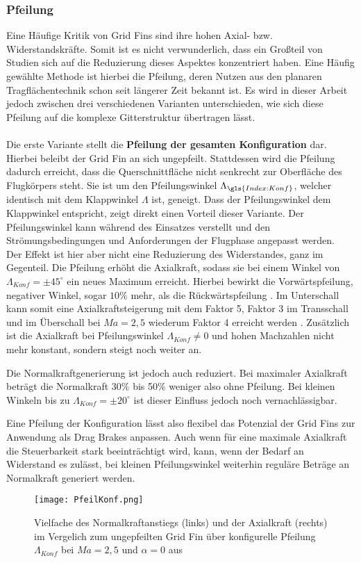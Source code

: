 \subsubsection{Pfeilung}
Eine Häufige Kritik von Grid Fins sind ihre hohen Axial- bzw. Widerstandskräfte. Somit ist es nicht verwunderlich, dass ein Großteil von Studien sich auf die Reduzierung dieses Aspektes konzentriert haben. Eine Häufig gewählte Methode ist hierbei die Pfeilung, deren Nutzen aus den planaren Tragflächentechnik schon seit längerer Zeit bekannt ist. Es wird in dieser Arbeit jedoch zwischen drei verschiedenen Varianten unterschieden, wie sich diese Pfeilung auf die komplexe Gitterstruktur übertragen lässt.\\
~\\
Die erste Variante stellt die \textbf{Pfeilung der gesamten Konfiguration} dar. Hierbei beleibt der Grid Fin an sich ungepfeilt. Stattdessen wird die Pfeilung dadurch erreicht, dass die Querschnittfläche nicht senkrecht zur Oberfläche des Flugkörpers steht. Sie ist um den Pfeilungswinkel $\Lambda_{\gls{Index:Konf}}$, welcher identisch mit dem Klappwinkel $\Lambda$ ist, geneigt. Dass der Pfeilungswinkel dem Klappwinkel entspricht, zeigt direkt einen Vorteil dieser Variante. Der Pfeilungswinkel kann während des Einsatzes verstellt und den Strömungsbedingungen und Anforderungen der Flugphase angepasst werden.\\
Der Effekt ist hier aber nicht eine Reduzierung des Widerstandes, ganz im Gegenteil. Die Pfeilung erhöht die Axialkraft, sodass sie bei einem Winkel von $\Lambda_{Konf} = \pm45^\circ$ ein neues Maximum erreicht. Hierbei bewirkt die Vorwärtspfeilung, negativer Winkel, sogar $10\%$ mehr, als die Rückwärtspfeilung \cite{LambdaKonf}. Im Unterschall kann somit eine Axialkraftsteigerung mit dem Faktor 5, Faktor 3 im Transschall und im Überschall bei $Ma = 2,5$ wiederum Faktor 4 erreicht werden \cite{LambdaKonf}. Zusätzlich ist die Axialkraft bei Pfeilungswinkel $\Lambda_{Konf} \neq 0$ und hohen Machzahlen nicht mehr konstant, sondern steigt noch weiter an.

Die Normalkraftgenerierung ist jedoch auch reduziert. Bei maximaler Axialkraft beträgt die Normalkraft 30\% bis 50\% weniger also ohne Pfeilung. Bei kleinen Winkeln bis zu $\Lambda_{Konf} = \pm20^\circ$ ist dieser Einfluss jedoch noch vernachlässigbar.

Eine Pfeilung der Konfiguration lässt also flexibel das Potenzial der Grid Fins zur Anwendung als Drag Brakes anpassen. Auch wenn für eine maximale Axialkraft die Steuerbarkeit stark beeinträchtigt wird, kann, wenn der Bedarf an Widerstand es zulässt, bei kleinen Pfeilungswinkel weiterhin reguläre Beträge an Normalkraft generiert werden.
\begin{figure}[h]
	\centering
	\texttt{[image: PfeilKonf.png]}
	\caption{Vielfache des Normalkraftanstiegs (links) und der Axialkraft (rechts) im Vergelich zum ungepfeilten Grid Fin über konfigurelle Pfeilung $\Lambda_{Konf}$ bei $Ma = 2,5$ und $\alpha = 0$ aus \cite{LambdaKonf}}
\end{figure}

